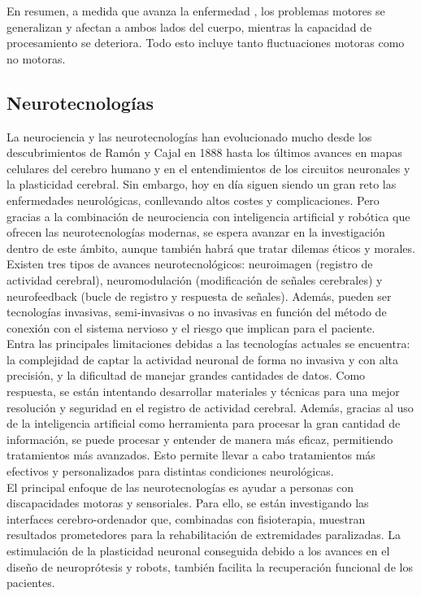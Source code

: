 En resumen, a medida que avanza la enfermedad , los problemas motores se generalizan y afectan a ambos lados del cuerpo, mientras la capacidad de procesamiento se deteriora. Todo esto incluye tanto fluctuaciones motoras como no motoras.\cite{martinez2016actualizacion}\\

\subsection{Neurotecnologías}

 La neurociencia y las neurotecnologías han evolucionado mucho desde los descubrimientos de Ramón y Cajal en 1888 hasta los últimos avances en mapas celulares del cerebro humano y en el entendimientos de los circuitos neuronales y la plasticidad cerebral. Sin embargo, hoy en día siguen siendo un gran reto las enfermedades neurológicas, conllevando altos costes y complicaciones. Pero gracias a la combinación de neurociencia con inteligencia artificial y robótica que ofrecen las neurotecnologías modernas, se espera avanzar en la investigación dentro de este ámbito, aunque también habrá que tratar dilemas éticos y morales.\cite{6OFICINA49:online}\\

Existen tres tipos de avances neurotecnológicos: neuroimagen (registro de actividad cerebral), neuromodulación (modificación de señales cerebrales) y neurofeedback (bucle de registro y respuesta de señales). Además, pueden ser tecnologías invasivas, semi-invasivas o no invasivas en función del método de conexión con el sistema nervioso y el riesgo que implican para el paciente.\\

Entra las principales limitaciones debidas a las tecnologías actuales se encuentra: la complejidad de captar la actividad neuronal de forma no invasiva y con alta precisión, y la dificultad de manejar grandes cantidades de datos. Como respuesta, se están intentando desarrollar materiales y técnicas para una mejor resolución y seguridad en el registro de actividad cerebral. Además, gracias al uso de la inteligencia artificial como herramienta para procesar la gran cantidad de información, se puede procesar y entender de manera más eficaz, permitiendo tratamientos más avanzados. Esto permite llevar a cabo tratamientos más efectivos y personalizados para distintas condiciones neurológicas.\\

El principal enfoque de las neurotecnologías es ayudar a personas con discapacidades motoras y sensoriales. Para ello, se están investigando las interfaces cerebro-ordenador que, combinadas con fisioterapia, muestran resultados prometedores para la rehabilitación de extremidades paralizadas. La estimulación de la plasticidad neuronal conseguida debido a los avances en el diseño de neuroprótesis y robots, también facilita la recuperación funcional de los pacientes.  \\

